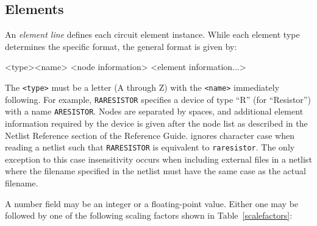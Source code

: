 \subsection{Elements}

An \emph{element line\/} defines each circuit element instance. While each element type determines the specific format, the general format is given by:
\begin{vquote}
<type><name> <node information> <element information...>
\end{vquote}
The \texttt{<type>} must be a letter (A through Z) with the
\texttt{<name>} immediately following.  For example, \texttt{RARESISTOR}
specifies a device of type ``R'' (for ``Resistor'') with a name
\texttt{ARESISTOR}.  Nodes are separated by spaces, and additional
element information required by the device is given after the node
list as described in the Netlist Reference section of the \Xyce{}
Reference Guide\ReferenceGuide{}.
\Xyce{} ignores character case when reading 
a netlist such that \texttt{RARESISTOR} is equivalent to \texttt{raresistor}.  The 
only exception to this case insensitivity occurs when including external files in a netlist  where 
the filename specified in the netlist must have the same case as the actual filename.

A number field may be an integer or a floating-point value.  Either one may be
followed by one of the following  scaling
factors shown in Table~\ref{scalefactors}:

\begin{table}[H]
  \caption{Scaling factors.}\label{scalefactors}
\end{table}

